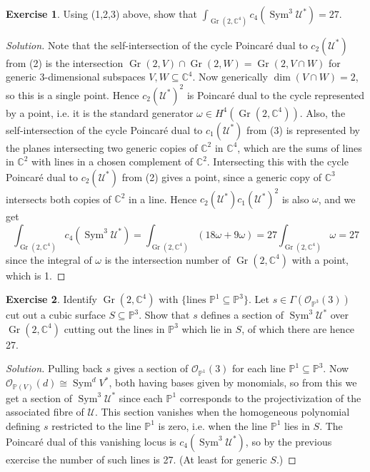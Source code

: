 \documentclass{article}
\theoremstyle{definition}
\newtheorem*{exercise}{Exercise}
\DeclareMathOperator{\Gr}{Gr}
\DeclareMathOperator{\Sym}{Sym}
\renewcommand{\O}{\mathcal{O}}
\newcommand{\U}{\mathcal{U}}
\renewcommand{\P}{\mathbb{P}}
\newcommand{\C}{\mathbb{C}}
\begin{document}
\begin{exercise}
    Using (1,2,3) above, show that $\int_{\Gr(2,\C^4)}c_4(\Sym^3\U^*)=27$.
\end{exercise}

\begin{proof}[Solution]
    Note that the self-intersection of the cycle Poincar\'e dual to $c_2(\U^*)$
    from (2) is the intersection $\Gr(2,V)\cap\Gr(2,W)=\Gr(2,V\cap W)$ for
    generic 3-dimensional subspaces $V,W\subseteq\C^4$. Now generically
    $\dim(V\cap W)=2$, so this is a single point. Hence $c_2(\U^*)^2$ is
    Poincar\'e dual to the cycle represented by a point, i.e. it is the standard
    generator $\omega\in H^4(\Gr(2,\C^4))$. Also, the self-intersection of the
    cycle Poincar\'e dual to $c_1(\U^*)$ from (3) is represented by the planes
    intersecting two generic copies of $\C^2$ in $\C^4$, which are the sums of
    lines in $\C^2$ with lines in a chosen complement of $\C^2$. Intersecting
    this with the cycle Poincar\'e dual to $c_2(\U^*)$ from (2) gives a point,
    since a generic copy of $\C^3$ intersects both copies of $\C^2$ in a line.
    Hence $c_2(\U^*)c_1(\U^*)^2$ is also $\omega$, and we get
    \begin{equation*}
        \int_{\Gr(2,\C^4)}c_4(\Sym^3\U^*)
            = \int_{\Gr(2,\C^4)}(18\omega+9\omega)
            = 27\int_{\Gr(2,\C^4)}\omega
            = 27
    \end{equation*}
    since the integral of $\omega$ is the intersection number of $\Gr(2,\C^4)$
    with a point, which is 1.
\end{proof}

\begin{exercise}
    Identify $\Gr(2,\C^4)$ with $\{\text{lines $\P^1\subseteq\P^3$}\}$. Let
    $s\in\Gamma(\O_{\P^3}(3))$ cut out a cubic surface $S\subseteq\P^3$. Show
    that $s$ defines a section of $\Sym^3\U^*$ over $\Gr(2,\C^4)$ cutting out
    the lines in $\P^3$ which lie in $S$, of which there are hence 27.
\end{exercise}

\begin{proof}[Solution]
    Pulling back $s$ gives a section of $\O_{\P^1}(3)$ for each line
    $\P^1\subseteq\P^3$. Now $\O_{\P(V)}(d)\cong\Sym^dV^*$, both having bases
    given by monomials, so from this we get a section of $\Sym^3\U^*$ since each
    $\P^1$ corresponds to the projectivization of the associated fibre of $\U$.
    This section vanishes when the homogeneous polynomial defining $s$
    restricted to the line $\P^1$ is zero, i.e. when the line $\P^1$ lies in
    $S$. The Poincar\'e dual of this vanishing locus is $c_4(\Sym^3\U^*)$, so by
    the previous exercise the number of such lines is 27. (At least for generic
    $S$.)
\end{proof}
\end{document}
